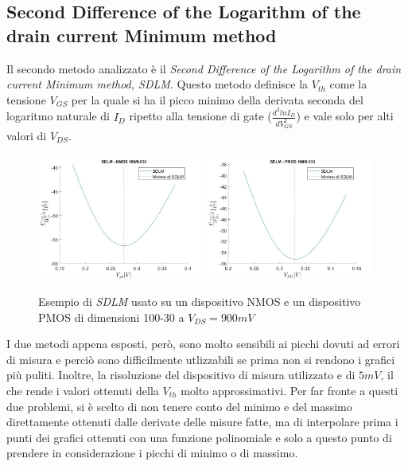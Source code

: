 \documentclass[12pt, letterpaper]{book}
\begin{document}
\subsection{Second Difference of the Logarithm of the drain current Minimum method}

Il secondo metodo analizzato è il \emph{Second Difference of the Logarithm of the drain current Minimum method, SDLM}. Questo metodo definisce la $V_{th}$ come la tensione $V_{GS}$ per la quale si ha il picco minimo della derivata seconda del logaritmo naturale di $I_D$ ripetto alla tensione di gate ($\frac{d^2lnI_D}{dV_{GS}^2}$) e vale solo per alti valori di $V_{DS}$. \\

\begin{figure}[h!]
\centering
 \includegraphics[width=0.49\textwidth]{SDLM-N4-100-30-NoFit}
 \includegraphics[width=0.49\textwidth]{SDLM-P1-100-30-NoFit}
 \caption{Esempio di \emph{SDLM} usato su un dispositivo NMOS e un dispositivo PMOS di dimensioni 100-30 a $V_{DS} = 900 mV$}
\end{figure}

I due metodi appena esposti, però, sono molto sensibili ai picchi dovuti ad errori di misura e perciò sono difficilmente utlizzabili se prima non si rendono i grafici più puliti. Inoltre, la risoluzione del dispositivo di misura utilizzato e di $5 mV$, il che rende i valori ottenuti della $V_{th}$ molto approssimativi.
Per far fronte a questi due problemi, si è scelto di non tenere conto del minimo e del massimo direttamente ottenuti dalle derivate delle misure fatte, ma di interpolare prima i punti dei grafici ottenuti con una funzione polinomiale e solo a questo punto di prendere in considerazione i picchi di minimo o di massimo. \\
\end{document}
